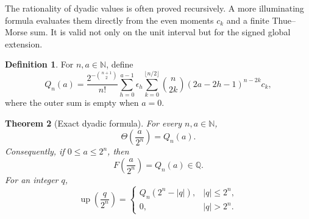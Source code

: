 \documentclass[11pt]{article}
\numberwithin{equation}{section}
\newtheorem{theorem}{Theorem}[section]
\theoremstyle{definition}
\newtheorem{definition}[theorem]{Definition}
\theoremstyle{remark}
\newcommand{\Q}{\mathbb{Q}}
\newcommand{\N}{\mathbb{N}}
\newcommand{\upf}{\operatorname{up}}
\newcommand{\Th}{\Theta}
\begin{document}
The rationality of dyadic values is often proved recursively.  A more
illuminating formula evaluates them directly from the even moments $c_k$ and
a finite Thue--Morse sum.  It is valid not only on the unit interval but for
the signed global extension.

\begin{definition}\label{def:Qna}
For $n,a\in\N$, define
\begin{equation}\label{eq:Qna}
 Q_n(a)=\frac{2^{-\binom{n+1}{2}}}{n!}
 \sum_{h=0}^{a-1}\epsilon_h
 \sum_{k=0}^{\lfloor n/2\rfloor}
 \binom{n}{2k}(2a-2h-1)^{n-2k}c_k,
\end{equation}
where the outer sum is empty when $a=0$.
\end{definition}

\begin{theorem}[Exact dyadic formula]\label{thm:closed-dyadic}
For every $n,a\in\N$,
\begin{equation}\label{eq:theta-Q}
 \Th\left(\frac{a}{2^n}\right)=Q_n(a).
\end{equation}
Consequently, if $0\le a\le2^n$, then
\begin{equation}\label{eq:F-Q}
 F\left(\frac{a}{2^n}\right)=Q_n(a)\in\Q.
\end{equation}
For an integer $q$,
\begin{equation}\label{eq:up-Q}
 \upf\left(\frac{q}{2^n}\right)=
 \begin{cases}
 Q_n(2^n-|q|),&|q|\le2^n,\\
 0,&|q|>2^n.
 \end{cases}
\end{equation}
\end{theorem}
\end{document}
